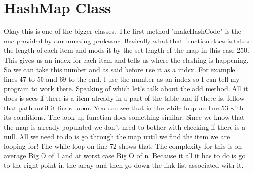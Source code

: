 \documentclass[letterpaper, 10pt]{article}
\begin{document}
\section{HashMap Class}
Okay this is one of the bigger classes. The first method "makeHashCode" is the one provided by our amazing professor. Basically what that function does is takes the length of each item and mods it by the set length of the map in this case 250. This gives us an index for each item and tells us where the clashing is happening. So we can take this number and as said before use it as a index. For example lines 47 to 50 and 69 to the end. I use the number as an index so I can tell my program to work there. Speaking of which let's talk about the add method. All it does is sees if there is a item already in a part of the table and if there is, follow that path until it finds room. You can see that in the while loop on line 53 with its conditions. The look up function does something similar. Since we know that the map is already populated we don't need to bother with checking if there is a null. All we need to do is go through the map until we find the item we are looping for! The while loop on line 72 shows that. The complexity for this is on average Big O of 1 and at worst case Big O of n. Because it all it has to do is go to the right point in the array and then go down the link list associated with it.
\end{document}
